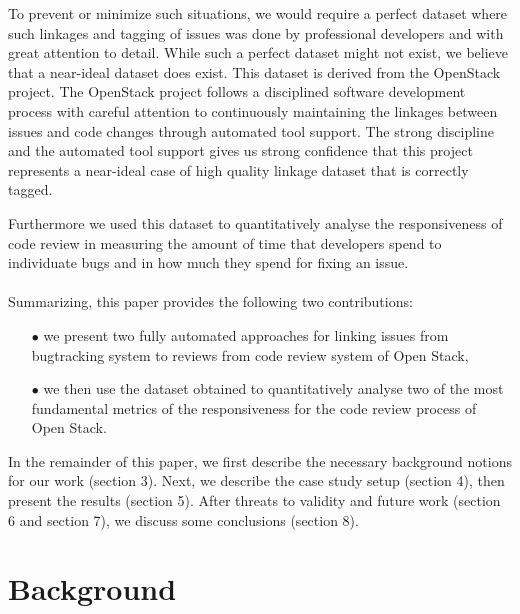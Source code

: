 \documentclass[ifip]{svmult}
\begin{document}
To prevent or minimize such situations, we would require a perfect dataset where such linkages 
and tagging of issues was done by professional developers and with great attention to detail. 
While such a perfect dataset might not exist, we believe that a near-ideal dataset does exist. 
This dataset is derived from the OpenStack project. The OpenStack project follows a disciplined 
software development process with careful attention to continuously maintaining the linkages 
between issues and code changes through automated tool support. The strong discipline and the 
automated tool support gives us strong confidence that this project represents a near-ideal 
case of high quality linkage dataset that is correctly tagged.

Furthermore we used this dataset to quantitatively analyse the responsiveness of code review in 
measuring the amount of time that developers spend to individuate bugs and in how much they spend 
for fixing an issue.
\\
\\
Summarizing, this paper provides the following two contributions:
\begin{itemize}
 \item[$\bullet$] we present two fully automated approaches for linking issues from 
 bugtracking system to reviews from code review system of Open Stack,
 \item[$\bullet$] we then use the dataset obtained to quantitatively analyse two of the 
 most fundamental metrics of the responsiveness for the code review process of Open Stack. 
\end{itemize}

In the remainder of this paper, we first describe the necessary background notions for our work (section 3). Next, we describe the 
case study setup (section 4), then present the results (section 5). After threats to 
validity and future work (section 6 and section 7), we discuss some conclusions (section 8).

\section{Background}
\label{sec:2}
\end{document}
